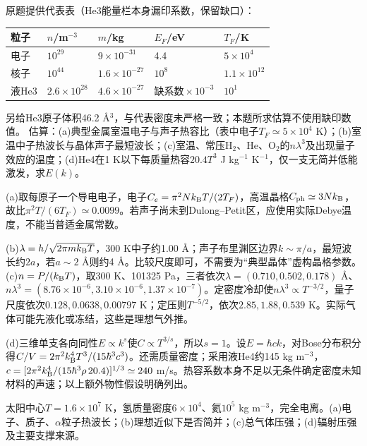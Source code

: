 \begin{exercise}[原题1(a)--(d)]\label{p:333-6-1}
原题提供代表表（He3能量栏本身漏印系数，保留缺口）：
\begin{center}\begin{tabular}{lllll}\toprule 粒子&$n$/m$^{-3}$&$m$/kg&$E_F$/eV&$T_F$/K\\\midrule 电子&$10^{29}$&$9\times10^{-31}$&4.4&$5\times10^4$\\ 核子&$10^{44}$&$1.6\times10^{-27}$&$10^8$&$1.1\times10^{12}$\\ 液He3&$2.6\times10^{28}$&$4.6\times10^{-27}$&$\text{缺系数}\times10^{-3}$&$10^1$\\\bottomrule\end{tabular}\end{center}
另给He3原子体积46.2 Å$^3$，与代表密度未严格一致；本题所求估算不使用缺印数值。
估算：(a)典型金属室温电子与声子热容比（表中电子$T_F\simeq5\times10^4$ K）；(b)室温中子热波长与晶体声子最短波长；(c)室温、常压H$_2$、He、O$_2$的$n\lambda^3$及出现量子效应的温度；(d)He4在1 K以下每质量热容$20.4T^3$ J kg$^{-1}$ K$^{-1}$，仅一支无简并低能激发，求$E(k)$。
\end{exercise}
\begin{solution}
(a)取每原子一个导电电子，电子$C_e=\pi^2Nk_{\mathrm B} T/(2T_F)$，高温晶格$C_{\rm ph}\simeq3Nk_{\mathrm B}$，故比$\pi^2T/(6T_F)\simeq0.0099$。若声子尚未到Dulong--Petit区，应使用实际Debye温度，不能当普适金属常数。

(b)$\lambda=h/\sqrt{2\pi mk_{\mathrm B} T}$，300 K中子约1.00 Å；声子布里渊区边界$k\sim\pi/a$，最短波长约$2a$，若$a\sim2$ Å则约4 Å。比较尺度即可，不需要为“典型晶体”虚构晶格参数。(c)$n=P/(k_{\mathrm B} T)$，取300 K、101325 Pa，三者依次$\lambda=(0.710,0.502,0.178)$ Å、$n\lambda^3=(8.76\times10^{-6},3.10\times10^{-6},1.37\times10^{-7})$。定密度冷却使$n\lambda^3\propto T^{-3/2}$，量子尺度依次$0.128,0.0638,0.00797$ K；定压则$T^{-5/2}$，依次$2.85,1.88,0.539$ K。实际气体可能先液化或冻结，这些是理想气外推。

(d)三维单支各向同性$E\propto k^s$使$C\propto T^{3/s}$，所以$s=1$。设$E=\hbar ck$，对Bose分布积分得$C/V=2\pi^2k_{\mathrm B}^4T^3/(15\hbar^3c^3)$。还需质量密度；采用液He4约145 kg m$^{-3}$，$c=[2\pi^2k_{\mathrm B}^4/(15\hbar^3\rho\,20.4)]^{1/3}\simeq240$ m/s。热容系数本身不足以无条件确定密度未知材料的声速；以上额外物性假设明确列出。
\end{solution}
\begin{exercise}[原题2(a)--(d)]\label{p:333-6-2}
太阳中心$T=1.6\times10^7$ K，氢质量密度$6\times10^4$、氦$10^5$ kg m$^{-3}$，完全电离。(a)电子、质子、$\alpha$粒子热波长；(b)理想近似下是否简并；(c)总气体压强；(d)辐射压强及主要支撑来源。
\end{exercise}
